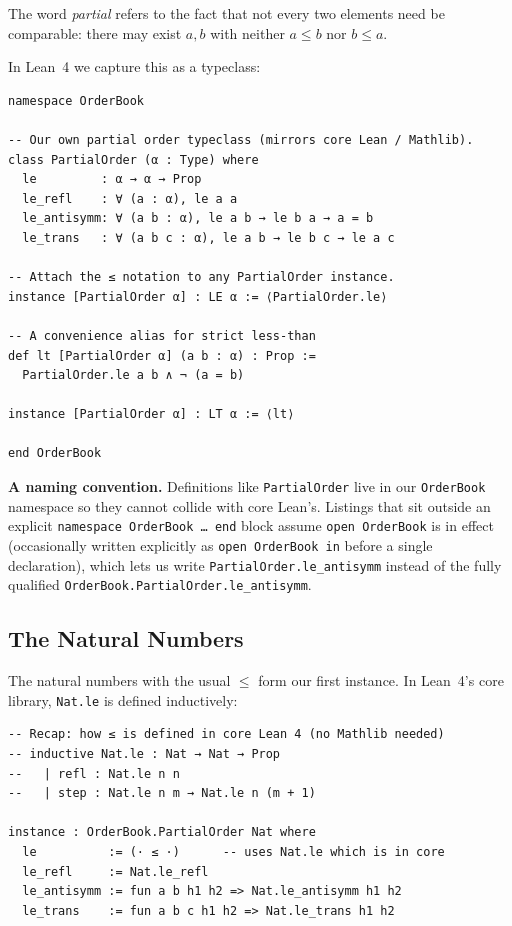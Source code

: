 \documentclass[12pt, a4paper, openright]{book}
\theoremstyle{thmstyle}
\theoremstyle{defstyle}
\newcommand{\lc}[1]{\texttt{#1}}
\newenvironment{notebox}{%
  \begin{tcolorbox}[notebox]%
}{\end{tcolorbox}}
\begin{document}
The word \emph{partial} refers to the fact that not every two elements need be
comparable: there may exist $a, b$ with neither $a \leq b$ nor $b \leq a$.

In Lean~4 we capture this as a typeclass:

\begin{verbatim}
namespace OrderBook

-- Our own partial order typeclass (mirrors core Lean / Mathlib).
class PartialOrder (α : Type) where
  le         : α → α → Prop
  le_refl    : ∀ (a : α), le a a
  le_antisymm: ∀ (a b : α), le a b → le b a → a = b
  le_trans   : ∀ (a b c : α), le a b → le b c → le a c

-- Attach the ≤ notation to any PartialOrder instance.
instance [PartialOrder α] : LE α := ⟨PartialOrder.le⟩

-- A convenience alias for strict less-than
def lt [PartialOrder α] (a b : α) : Prop :=
  PartialOrder.le a b ∧ ¬ (a = b)

instance [PartialOrder α] : LT α := ⟨lt⟩

end OrderBook
\end{verbatim}

\begin{notebox}
  \textbf{A naming convention.} Definitions like \lc{PartialOrder} live in
  our \lc{OrderBook} namespace so they cannot collide with core Lean's.
  Listings that sit outside an explicit \lc{namespace OrderBook … end}
  block assume \lc{open OrderBook} is in effect (occasionally written
  explicitly as \lc{open OrderBook in} before a single declaration), which
  lets us write \lc{PartialOrder.le\_antisymm} instead of the fully
  qualified \lc{OrderBook.PartialOrder.le\_antisymm}.
\end{notebox}

\subsection{The Natural Numbers}

The natural numbers with the usual $\leq$ form our first instance.
In Lean~4's core library, \lc{Nat.le} is defined inductively:

\begin{verbatim}
-- Recap: how ≤ is defined in core Lean 4 (no Mathlib needed)
-- inductive Nat.le : Nat → Nat → Prop
--   | refl : Nat.le n n
--   | step : Nat.le n m → Nat.le n (m + 1)

instance : OrderBook.PartialOrder Nat where
  le          := (· ≤ ·)      -- uses Nat.le which is in core
  le_refl     := Nat.le_refl
  le_antisymm := fun a b h1 h2 => Nat.le_antisymm h1 h2
  le_trans    := fun a b c h1 h2 => Nat.le_trans h1 h2
\end{verbatim}
\end{document}

